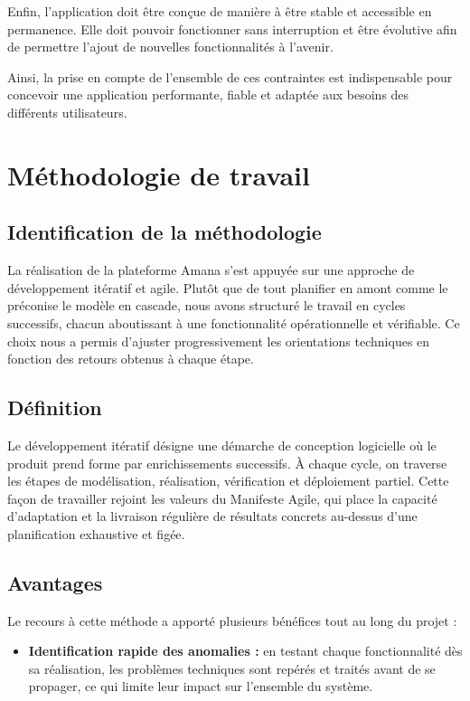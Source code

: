 \documentclass[12pt,fleqn,a4paper]{report}
\begin{document}
\begin{justify}
Enfin, l'application doit être conçue de manière à être stable et accessible en permanence. Elle doit pouvoir fonctionner sans interruption et être évolutive afin de permettre l'ajout de nouvelles fonctionnalités à l'avenir.

Ainsi, la prise en compte de l'ensemble de ces contraintes est indispensable pour concevoir une application performante, fiable et adaptée aux besoins des différents utilisateurs.

\section{Méthodologie de travail}

\subsection{Identification de la méthodologie}

La réalisation de la plateforme Amana s'est appuyée sur une approche de développement
itératif et agile. Plutôt que de tout planifier en amont comme le préconise le modèle
en cascade, nous avons structuré le travail en cycles successifs, chacun aboutissant
à une fonctionnalité opérationnelle et vérifiable. Ce choix nous a permis d'ajuster
progressivement les orientations techniques en fonction des retours obtenus à chaque étape.

\subsection{Définition}

Le développement itératif désigne une démarche de conception logicielle où le produit
prend forme par enrichissements successifs. À chaque cycle, on traverse les étapes de
modélisation, réalisation, vérification et déploiement partiel. Cette façon de travailler
rejoint les valeurs du Manifeste Agile, qui place la capacité d'adaptation et la livraison
régulière de résultats concrets au-dessus d'une planification exhaustive et figée.

\subsection{Avantages}

Le recours à cette méthode a apporté plusieurs bénéfices tout au long du projet :

\begin{itemize}
    \item \textbf{Identification rapide des anomalies :} en testant chaque fonctionnalité
    dès sa réalisation, les problèmes techniques sont repérés et traités avant de se
    propager, ce qui limite leur impact sur l'ensemble du système.


\end{itemize}
\end{justify}
\end{document}
